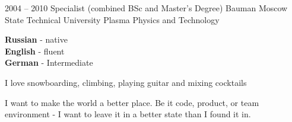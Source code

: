 \documentclass[9pt]{developercv} %
\begin{document}


\begin{entrylist}
	\entry
		{2004 -- 2010}
		{Specialist (combined BSc and Master’s Degree)}
		{Bauman Moscow State Technical University}
		{Plasma Physics and Technology}
\end{entrylist}


\begin{minipage}[t]{0.3\textwidth}
	\vspace{-\baselineskip} %

	
	\textbf{Russian} - native\\
	\textbf{English} - fluent\\
	\textbf{German} - Intermediate
\end{minipage}
\hfill
\begin{minipage}[t]{0.3\textwidth}
	\vspace{-\baselineskip} %
	
	
	I love snowboarding, climbing, playing guitar and mixing cocktails
\end{minipage}
\hfill
\begin{minipage}[t]{0.3\textwidth}
	\vspace{-\baselineskip} %
	
	
	I want to make the world a better place. Be it code, product, or team environment -
	I want to leave it in a better state than I found it in.
\end{minipage}

\end{document}
